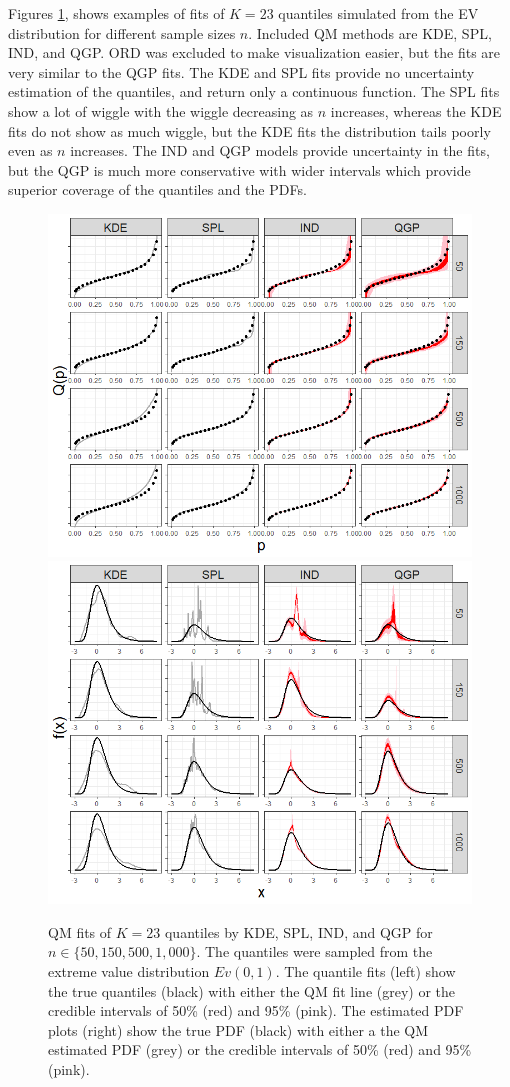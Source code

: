 Figures \ref{fig:evd_fits}, 
shows examples of fits of $K=23$ quantiles simulated from the EV distribution
for different sample sizes $n$. Included QM methods 
are KDE, SPL, IND, and QGP. ORD was excluded to make visualization easier, but 
the fits are very similar to the QGP fits. The KDE and SPL fits provide no 
uncertainty estimation of the quantiles, and return only a continuous function. 
The SPL fits show a lot of wiggle with the wiggle decreasing as $n$ increases, 
whereas the KDE fits do not show as much wiggle, but the KDE fits the 
distribution tails poorly even as $n$ increases. The IND and QGP models provide 
uncertainty in the fits, but the QGP is much more conservative with wider 
intervals which provide superior coverage of the quantiles and the PDFs. 




\begin{figure}[hbt!]
\centering
  \centering
  \includegraphics[width=.49\linewidth]{Images/quants_evd.png}
  \centering
  \includegraphics[width=.49\linewidth]{Images/dens_evd.png}
\caption{QM fits of $K=23$ quantiles by KDE, SPL, IND, and QGP for 
$n \in \{50, 150, 500, 1{,}000\}$. The quantiles were sampled from the extreme 
value distribution $Ev(0,1)$. The quantile fits (left) show the true quantiles 
(black) with either the QM fit line (grey) or the credible intervals of 50\% 
(red) and 95\% (pink). 
The estimated PDF plots (right) show the true PDF (black) with either a the QM 
estimated PDF (grey) or the credible intervals of 50\% (red) and 95\% (pink).}
\label{fig:evd_fits}
\end{figure}

